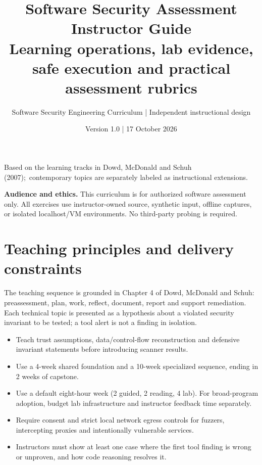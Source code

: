\documentclass[10pt,letterpaper]{article}
\title{\vspace{-1.6cm}\Huge\color{navy}\bfseries Software Security Assessment Instructor Guide\\[8pt]\large\color{teal}Learning operations, lab evidence, safe execution and practical assessment rubrics}
\author{Software Security Engineering Curriculum | Independent instructional design}
\date{Version 1.0 | 17 October 2026}
\begin{document}
\maketitle
\begin{center}\small Based on the learning tracks in Dowd, McDonald and Schuh (2007);\
contemporary topics are separately labeled as instructional extensions.\end{center}
\begin{insight}\textbf{Audience and ethics.} This curriculum is for authorized software assessment only. All exercises use instructor-owned source, synthetic input, offline captures, or isolated localhost/VM environments. No third-party probing is required.\end{insight}
\tableofcontents
\clearpage
\section{Teaching principles and delivery constraints}
The teaching sequence is grounded in Chapter 4 of Dowd, McDonald and Schuh: preassessment, plan, work, reflect, document, report and support remediation. Each technical topic is presented as a hypothesis about a violated security invariant to be tested; a tool alert is not a finding in isolation.

\begin{itemize}[leftmargin=*,itemsep=2pt]
\item Teach trust assumptions, data/control-flow reconstruction and defensive invariant statements before introducing scanner results.
\item Use a 4-week shared foundation and a 10-week specialized sequence, ending in 2 weeks of capstone.
\item Use a default eight-hour week (2 guided, 2 reading, 4 lab). For broad-program adoption, budget lab infrastructure and instructor feedback time separately.
\item Require consent and strict local network egress controls for fuzzers, intercepting proxies and intentionally vulnerable services.
\item Instructors must show at least one case where the first tool finding is wrong or unproven, and how code reasoning resolves it.
\end{itemize}
\end{document}
